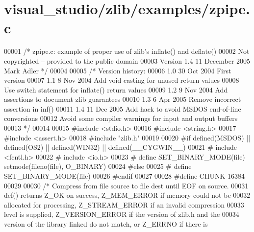 \hypertarget{visual__studio_2zlib_2examples_2zpipe_8c_source}{}\section{visual\+\_\+studio/zlib/examples/zpipe.c}
\label{visual__studio_2zlib_2examples_2zpipe_8c_source}

\begin{DoxyCode}
00001 \textcolor{comment}{/* zpipe.c: example of proper use of zlib's inflate() and deflate()}
00002 \textcolor{comment}{   Not copyrighted -- provided to the public domain}
00003 \textcolor{comment}{   Version 1.4  11 December 2005  Mark Adler */}
00004 
00005 \textcolor{comment}{/* Version history:}
00006 \textcolor{comment}{   1.0  30 Oct 2004  First version}
00007 \textcolor{comment}{   1.1   8 Nov 2004  Add void casting for unused return values}
00008 \textcolor{comment}{                     Use switch statement for inflate() return values}
00009 \textcolor{comment}{   1.2   9 Nov 2004  Add assertions to document zlib guarantees}
00010 \textcolor{comment}{   1.3   6 Apr 2005  Remove incorrect assertion in inf()}
00011 \textcolor{comment}{   1.4  11 Dec 2005  Add hack to avoid MSDOS end-of-line conversions}
00012 \textcolor{comment}{                     Avoid some compiler warnings for input and output buffers}
00013 \textcolor{comment}{ */}
00014 
00015 \textcolor{preprocessor}{#include <stdio.h>}
00016 \textcolor{preprocessor}{#include <string.h>}
00017 \textcolor{preprocessor}{#include <assert.h>}
00018 \textcolor{preprocessor}{#include "zlib.h"}
00019 
00020 \textcolor{preprocessor}{#if defined(MSDOS) || defined(OS2) || defined(WIN32) || defined(\_\_CYGWIN\_\_)}
00021 \textcolor{preprocessor}{#  include <fcntl.h>}
00022 \textcolor{preprocessor}{#  include <io.h>}
00023 \textcolor{preprocessor}{#  define SET\_BINARY\_MODE(file) setmode(fileno(file), O\_BINARY)}
00024 \textcolor{preprocessor}{#else}
00025 \textcolor{preprocessor}{#  define SET\_BINARY\_MODE(file)}
00026 \textcolor{preprocessor}{#endif}
00027 
00028 \textcolor{preprocessor}{#define CHUNK 16384}
00029 
00030 \textcolor{comment}{/* Compress from file source to file dest until EOF on source.}
00031 \textcolor{comment}{   def() returns Z\_OK on success, Z\_MEM\_ERROR if memory could not be}
00032 \textcolor{comment}{   allocated for processing, Z\_STREAM\_ERROR if an invalid compression}
00033 \textcolor{comment}{   level is supplied, Z\_VERSION\_ERROR if the version of zlib.h and the}
00034 \textcolor{comment}{   version of the library linked do not match, or Z\_ERRNO if there is}

\end{DoxyCode}
